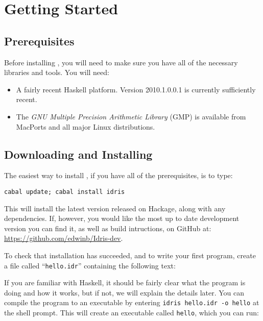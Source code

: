 \section{Getting Started}

\subsection{Prerequisites}

Before installing \Idris{}, you will need to make sure you have all of the necessary libraries and tools.
You will need:

\begin{itemize}
\item A fairly recent Haskell platform. Version 2010.1.0.0.1 is currently sufficiently recent.
\item The \emph{GNU Multiple Precision Arithmetic Library} (GMP) is available from MacPorts and all major Linux distributions.
\end{itemize}

\subsection{Downloading and Installing}

The easiest way to install \Idris{}, if you have all of the prerequisites, is to type:

\begin{lstlisting}[style=stdout]
cabal update; cabal install idris
\end{lstlisting}

\noindent
This will install the latest version released on Hackage, along with any dependencies.
If, however, you would like the most up to date development version you can find it, as well as build intructions, on GitHub at: \url{https://github.com/edwinb/Idris-dev}.

To check that installation has succeeded, and to write your first \Idris{} program, create a file called ``\texttt{hello.idr}'' containing the following text:


\noindent
If you are familiar with Haskell, it should be fairly clear what the program is doing and how it works, but if not, we will explain the details later.
You can compile the program to an executable by entering \texttt{idris hello.idr -o hello} at the shell prompt.
This will create an executable called \texttt{hello}, which you can run:

